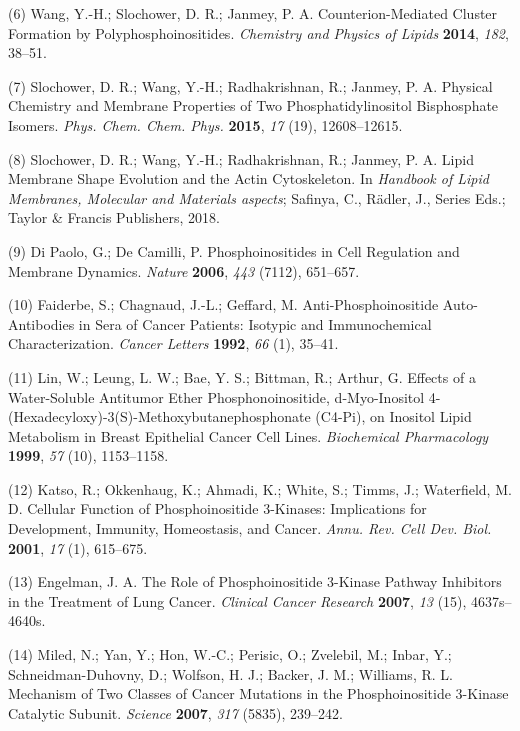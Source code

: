 \documentclass[11pt,notitlepage]{article}
\begin{document}
\leavevmode\hypertarget{ref-Ag1rh6TA}{}%
(6) Wang, Y.-H.; Slochower, D. R.; Janmey, P. A. Counterion-Mediated
Cluster Formation by Polyphosphoinositides. \emph{Chemistry and Physics
of Lipids} \textbf{2014}, \emph{182}, 38--51.

\leavevmode\hypertarget{ref-1E1rz4J4o}{}%
(7) Slochower, D. R.; Wang, Y.-H.; Radhakrishnan, R.; Janmey, P. A.
Physical Chemistry and Membrane Properties of Two Phosphatidylinositol
Bisphosphate Isomers. \emph{Phys. Chem. Chem. Phys.} \textbf{2015},
\emph{17} (19), 12608--12615.

\leavevmode\hypertarget{ref-1AHXI1BtY}{}%
(8) Slochower, D. R.; Wang, Y.-H.; Radhakrishnan, R.; Janmey, P. A.
Lipid Membrane Shape Evolution and the Actin Cytoskeleton. In
\emph{Handbook of Lipid Membranes, Molecular and Materials aspects};
Safinya, C., Rädler, J., Series Eds.; Taylor \& Francis Publishers,
2018.

\leavevmode\hypertarget{ref-GGlssBvj}{}%
(9) Di Paolo, G.; De Camilli, P. Phosphoinositides in Cell Regulation
and Membrane Dynamics. \emph{Nature} \textbf{2006}, \emph{443} (7112),
651--657.

\leavevmode\hypertarget{ref-8Xw2kuUO}{}%
(10) Faiderbe, S.; Chagnaud, J.-L.; Geffard, M. Anti-Phosphoinositide
Auto-Antibodies in Sera of Cancer Patients: Isotypic and Immunochemical
Characterization. \emph{Cancer Letters} \textbf{1992}, \emph{66} (1),
35--41.

\leavevmode\hypertarget{ref-12CAxA8dE}{}%
(11) Lin, W.; Leung, L. W.; Bae, Y. S.; Bittman, R.; Arthur, G. Effects
of a Water-Soluble Antitumor Ether Phosphonoinositide, d-Myo-Inositol
4-(Hexadecyloxy)-3(S)-Methoxybutanephosphonate (C4-Pi), on Inositol
Lipid Metabolism in Breast Epithelial Cancer Cell Lines.
\emph{Biochemical Pharmacology} \textbf{1999}, \emph{57} (10),
1153--1158.

\leavevmode\hypertarget{ref-l2gqdgv}{}%
(12) Katso, R.; Okkenhaug, K.; Ahmadi, K.; White, S.; Timms, J.;
Waterfield, M. D. Cellular Function of Phosphoinositide 3-Kinases:
Implications for Development, Immunity, Homeostasis, and Cancer.
\emph{Annu. Rev. Cell Dev. Biol.} \textbf{2001}, \emph{17} (1),
615--675.

\leavevmode\hypertarget{ref-izLqFTEH}{}%
(13) Engelman, J. A. The Role of Phosphoinositide 3-Kinase Pathway
Inhibitors in the Treatment of Lung Cancer. \emph{Clinical Cancer
Research} \textbf{2007}, \emph{13} (15), 4637s--4640s.

\leavevmode\hypertarget{ref-1HRoQaadQ}{}%
(14) Miled, N.; Yan, Y.; Hon, W.-C.; Perisic, O.; Zvelebil, M.; Inbar,
Y.; Schneidman-Duhovny, D.; Wolfson, H. J.; Backer, J. M.; Williams, R.
L. Mechanism of Two Classes of Cancer Mutations in the Phosphoinositide
3-Kinase Catalytic Subunit. \emph{Science} \textbf{2007}, \emph{317}
(5835), 239--242.
\end{document}
